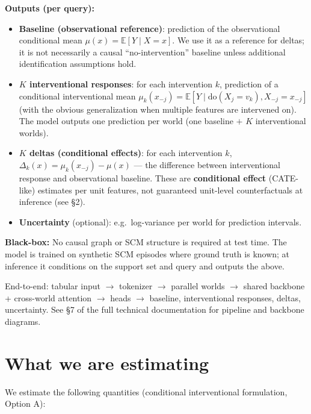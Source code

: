 \documentclass[12pt]{article}
\begin{document}
\textbf{Outputs (per query):}
\begin{itemize}
    \item \textbf{Baseline (observational reference)}: prediction of the observational conditional mean $\mu(x) = \mathbb{E}[Y \mid X = x]$. We use it as a reference for deltas; it is not necessarily a causal ``no-intervention'' baseline unless additional identification assumptions hold.
    \item \textbf{$K$ interventional responses}: for each intervention $k$, prediction of a conditional interventional mean $\mu_k(x_{-j}) = \mathbb{E}[Y \mid \text{do}(X_j = v_k), X_{-j} = x_{-j}]$ (with the obvious generalization when multiple features are intervened on). The model outputs one prediction per world (one baseline $+$ $K$ interventional worlds).
    \item \textbf{$K$ deltas (conditional effects)}: for each intervention $k$, $\Delta_k(x) = \mu_k(x_{-j}) - \mu(x)$ --- the difference between interventional response and observational baseline. These are \textbf{conditional effect} (CATE-like) estimates per unit features, not guaranteed unit-level counterfactuals at inference (see \S2).
    \item \textbf{Uncertainty} (optional): e.g.\ log-variance per world for prediction intervals.
\end{itemize}

\textbf{Black-box:} No causal graph or SCM structure is required at test time. The model is trained on synthetic SCM episodes where ground truth is known; at inference it conditions on the support set and query and outputs the above.

End-to-end: tabular input $\to$ tokenizer $\to$ parallel worlds $\to$ shared backbone + cross-world attention $\to$ heads $\to$ baseline, interventional responses, deltas, uncertainty. See \S7 of the full technical documentation for pipeline and backbone diagrams.

\section{What we are estimating}

We estimate the following quantities (conditional interventional formulation, Option A):
\end{document}
